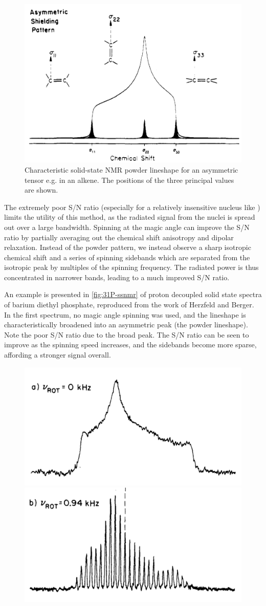 \begin{refsection}
\begin{figure}
  \centering
  \includegraphics[width=0.45\linewidth]{Figures/ssnmr-tensor.pdf}
  \caption[SSNMR powder lineshape]{Characteristic solid-state NMR powder lineshape for an asymmetric tensor e.g. in an alkene. The positions of the three principal values are shown.}
  \label{fig:ssnmr-tensor}
\end{figure}

The extremely poor S/N ratio (especially for a relatively insensitive nucleus like ) limits the utility of this method, as the radiated signal from the nuclei is spread out over a large bandwidth.
Spinning at the magic angle can improve the S/N ratio by partially averaging out the chemical shift anisotropy and dipolar relaxation.
Instead of the powder pattern, we instead observe a sharp isotropic chemical shift and a series of spinning sidebands which are separated from the isotropic peak by multiples of the spinning frequency.
The radiated power is thus concentrated in narrower bands, leading to a much improved S/N ratio.

An example is presented in \cref{fig:31P-ssnmr} of proton decoupled solid state  spectra of barium diethyl phosphate, reproduced from the work of Herzfeld and Berger\autocite{Herzfeld1980SidebandAngle}.
In the first spectrum, no magic angle spinning was used, and the lineshape is characteristically broadened into an asymmetric peak (the powder lineshape).
Note the poor S/N ratio due to the broad peak.
The S/N ratio can be seen to improve as the spinning speed increases, and the sidebands become more sparse, affording a stronger signal overall.

\begin{figure}
    \centering
    \includegraphics[width=0.45\linewidth]{Figures/31P-ssnmr-0khz.pdf}
    \includegraphics[width=0.45\linewidth]{Figures/31P-ssnmr-0.94khz.pdf}


\end{figure}
\end{refsection}
